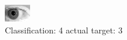 \begin{figure}[h!]
\begin{center}
\includegraphics[width=0.60\columnwidth]{figures/ID227_class_4_target_3.png}
\end{center}
\caption{ Classification: 4 actual target: 3}
\label{fig:ID227_class_4_target_3}
\end{figure}
